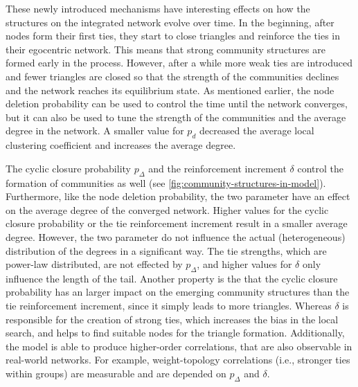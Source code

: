 These newly introduced mechanisms have interesting effects on how the structures on the integrated network evolve over time.
In the beginning, after nodes form their first ties, they start to close triangles and reinforce the ties in their egocentric network.
This means that strong community structures are formed early in the process.
However, after a while more weak ties are introduced and fewer triangles are closed so that the strength of the communities declines and the network reaches its equilibrium state.
As mentioned earlier, the node deletion probability can be used to control the time until the network converges, but it can also be used to tune the strength of the communities and the average degree in the network.
A smaller value for \( p_{d} \) decreased the average local clustering coefficient and increases the average degree.

The cyclic closure probability \( p_{\Delta} \) and the reinforcement increment \( \delta \) control the formation of communities as well (see \autoref{fig:community-structures-in-model}).
Furthermore, like the node deletion probability, the two parameter have an effect on the average degree of the converged network.
Higher values for the cyclic closure probability or the tie reinforcement increment result in a smaller average degree.
However, the two parameter do not influence the actual (heterogeneous) distribution of the degrees in a significant way.
The tie strengths, which are power-law distributed, are not effected by \( p_{\Delta} \), and higher values for \( \delta \) only influence the length of the tail.
Another property is the that the cyclic closure probability has an larger impact on the emerging community structures than the tie reinforcement increment, since it simply leads to more triangles.
Whereas \( \delta \) is responsible for the creation of strong ties, which increases the bias in the local search, and helps to find suitable nodes for the triangle formation.
Additionally, the model is able to produce higher-order correlations, that are also observable in real-world networks.
For example, weight-topology correlations (i.e., stronger ties within groups) are measurable and are depended on \( p_{\Delta} \) and \( \delta \).


